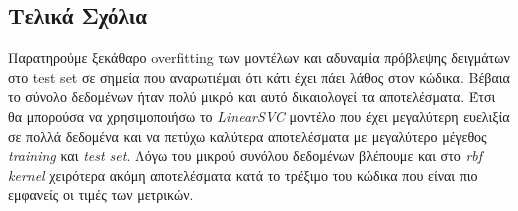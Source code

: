 \documentclass[10pt,a4paper,]{article}
\begin{document}
\subsection{Τελικά Σχόλια}
Παρατηρούμε ξεκάθαρο overfitting των μοντέλων και αδυναμία πρόβλεψης δειγμάτων στο test set σε σημεία που αναρωτιέμαι ότι κάτι έχει πάει λάθος στον κώδικα. Βέβαια το σύνολο δεδομένων ήταν πολύ μικρό και αυτό δικαιολογεί τα αποτελέσματα. Έτσι θα μπορούσα να χρησιμοποιήσω το \textit{LinearSVC} μοντέλο που έχει μεγαλύτερη ευελιξία σε πολλά δεδομένα και να πετύχω καλύτερα αποτελέσματα με μεγαλύτερο μέγεθος \textit{training} και \textit{test set}. Λόγω του μικρού συνόλου δεδομένων βλέπουμε και στο \textit{rbf }\textit{kernel} χειρότερα ακόμη αποτελέσματα κατά το τρέξιμο του κώδικα που είναι πιο εμφανείς οι τιμές των μετρικών. 
\end{document}
